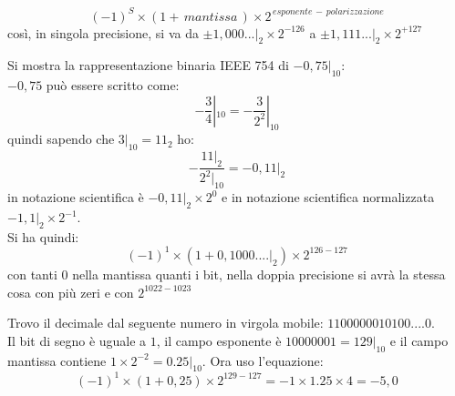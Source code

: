 \documentclass[a4paper,12pt, oneside]{book}
\begin{document}
\begin{enumerate}
$$(-1)^S\times(1+\, mantissa\,)\times 2^{\,esponente\,-\,polarizzazione} $$
così, in singola precisione, si va da $\pm 1,000...|_2\times 2^{-126}$ a $\pm 1,111...|_2\times 2^{+127}$
\begin{esempio}
Si mostra la rappresentazione binaria IEEE 754 di $-0,75|_{10}$:\\
$-0,75$ può essere scritto come: 
$$-\frac{3}{4}|_{10}=-\frac{3}{2^2}|_{10}$$
quindi sapendo che $3|_{10}=11_{2}$ ho:
$$-\frac{11|_2}{2^2|_{10}}=-0,11|_2$$
in notazione scientifica è $-0,11|_2\times 2^0$ e in notazione scientifica normalizzata $-1,1|_{2}\times 2^{-1}$.\\ Si ha quindi:
$$(-1)^1\times (1+0,1000....|_2)\times 2^{126-127}$$
con tanti 0 nella mantissa quanti i bit, nella doppia precisione si avrà la stessa cosa con più zeri e con $2^{1022-1023}$
\end{esempio}
\begin{esempio}
Trovo il decimale dal seguente numero in virgola mobile: $1100000010100....0$.\\ Il bit di segno è uguale a $1$, il campo esponente è $10000001=129|_{10}$ e il campo mantissa contiene $1\times 2^{-2}=0.25|_{10}$. Ora uso l'equazione:
$$(-1)^1\times (1+0,25)\times 2^{129-127}= -1\times 1.25\times 4=-5,0$$
\end{esempio}
\end{enumerate}
\end{document}
